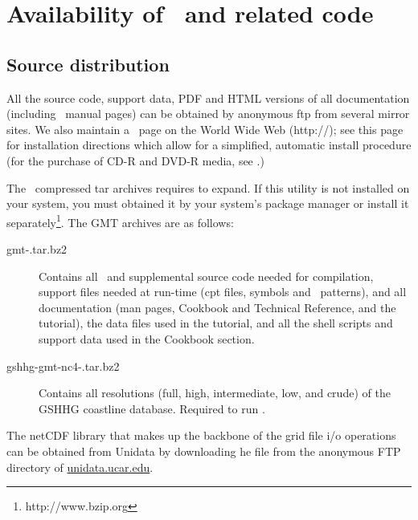 %
%
\chapter{Availability of \gmt\ and related code}
\label{app:D}

\section{Source distribution}
All the source code, support data, PDF
and HTML versions of all documentation (including \UNIX\
manual pages) can be obtained by anonymous
ftp from several mirror sites.  We also maintain a \GMT\
page on the World Wide Web (http://\GMTSITE);
see this page for installation directions 
which allow for a simplified, automatic install procedure
(for the purchase of CD-R and DVD-R media, see .)

The \GMT\ compressed tar archives requires \progname{bzip2} to expand.  If this utility
is not installed on your system, you must obtained it by your system's package manager
or install it separately\footnote{http://www.bzip.org}.
The GMT archives are as follows:

\begin{description}

\item[gmt-\GMTDOCVERSION.tar.bz2] Contains all \GMT\ and supplemental source code needed for compilation, support files
	needed at run-time (cpt files, symbols and \PS\ patterns), and all documentation
	(man pages, Cookbook and Technical Reference, and the tutorial), the data files
	used in the tutorial, and all the shell scripts and support data used in the Cookbook section.

\item[gshhg-gmt-nc4-\GSHHGVERSION.tar.bz2] Contains all resolutions (full, high, intermediate,
low, and crude) of the GSHHG coastline database.  Required to run \GMT.

\end{description}


The netCDF library that makes up the backbone of the grid file
i/o operations can be obtained from Unidata by downloading he file
\filename{netcdf.tar.Z} from the anonymous FTP directory of
\underline{unidata.ucar.edu}.

